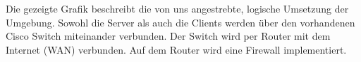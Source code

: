 Die gezeigte Grafik beschreibt die von uns angestrebte, logische Umsetzung der Umgebung. Sowohl die Server als auch die Clients werden über den vorhandenen Cisco Switch miteinander verbunden. Der Switch wird per Router mit dem Internet (WAN) verbunden. Auf dem Router wird eine Firewall implementiert.







